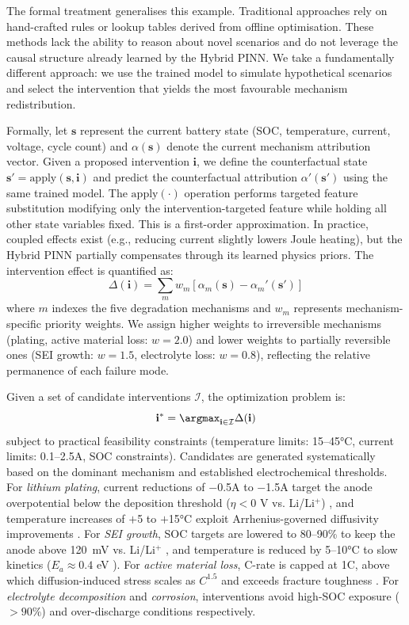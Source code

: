 \documentclass[5p,times,authoryear]{elsarticle}
\begin{document}
The formal treatment generalises this example. Traditional approaches rely on hand-crafted rules or lookup tables derived from offline optimisation. These methods lack the ability to reason about novel scenarios and do not leverage the causal structure already learned by the Hybrid PINN. We take a fundamentally different approach: we use the trained model to simulate hypothetical scenarios and select the intervention that yields the most favourable mechanism redistribution.

Formally, let $\mathbf{s}$ represent the current battery state (SOC, temperature, current, voltage, cycle count) and $\alpha(\mathbf{s})$ denote the current mechanism attribution vector. Given a proposed intervention $\mathbf{i}$, we define the counterfactual state $\mathbf{s}' = \text{apply}(\mathbf{s}, \mathbf{i})$ and predict the counterfactual attribution $\alpha'(\mathbf{s}')$ using the same trained model. The $\text{apply}(\cdot)$ operation performs targeted feature substitution modifying only the intervention-targeted feature while holding all other state variables fixed. This is a first-order approximation. In practice, coupled effects exist (e.g., reducing current slightly lowers Joule heating), but the Hybrid PINN partially compensates through its learned physics priors. The intervention effect is quantified as:
\begin{equation}
\Delta(\mathbf{i}) = \sum_{m} w_m \left[ \alpha_m(\mathbf{s}) - \alpha_m'(\mathbf{s}') \right]
\end{equation}
where $m$ indexes the five degradation mechanisms and $w_m$ represents mechanism-specific priority weights. We assign higher weights to irreversible mechanisms (plating, active material loss: $w = 2.0$) and lower weights to partially reversible ones (SEI growth: $w = 1.5$, electrolyte loss: $w = 0.8$), reflecting the relative permanence of each failure mode.

Given a set of candidate interventions $\mathcal{I}$, the optimization problem is:
\begin{equation}
\mathbf{i}^* = \argmax_{\mathbf{i} \in \mathcal{I}} \Delta(\mathbf{i})
\end{equation}
subject to practical feasibility constraints (temperature limits: 15--45°C, current limits: 0.1--2.5A, SOC constraints). Candidates are generated systematically based on the dominant mechanism and established electrochemical thresholds. For \emph{lithium plating}, current reductions of $-$0.5A to $-$1.5A target the anode overpotential below the deposition threshold ($\eta < 0$ V vs. Li/Li$^+$) \citep{petzl2015lithium}, and temperature increases of $+$5 to $+$15°C exploit Arrhenius-governed diffusivity improvements \citep{waldmann2014temperature}. For \emph{SEI growth}, SOC targets are lowered to 80--90\% to keep the anode above 120~mV vs. Li/Li$^+$ \citep{pinson2013theory}, and temperature is reduced by 5--10°C to slow kinetics ($E_a \approx 0.4$ eV \citep{broussely2005main}). For \emph{active material loss}, C-rate is capped at 1C, above which diffusion-induced stress scales as $C^{1.5}$ and exceeds fracture toughness \citep{birkl2017degradation}. For \emph{electrolyte decomposition} and \emph{corrosion}, interventions avoid high-SOC exposure ($> 90\%$) and over-discharge conditions respectively.
\end{document}
